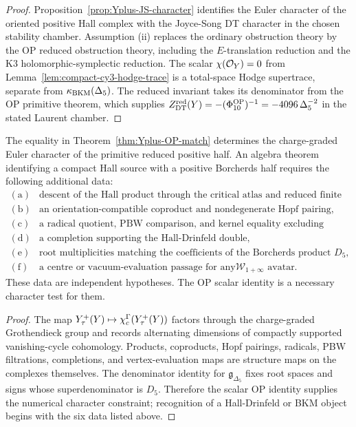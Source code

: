 \begin{proof}
Proposition~\ref{prop:Yplus-JS-character} identifies the Euler character
of the oriented positive Hall complex with the Joyce-Song DT character
in the chosen stability chamber. Assumption (ii) replaces the ordinary
obstruction theory by the OP reduced obstruction theory, including the
$E$-translation reduction and the K3 holomorphic-symplectic reduction.
The scalar $\chi(\mathcal{O}_Y)=0$ from
Lemma~\ref{lem:compact-cy3-hodge-trace} is a total-space Hodge
supertrace, separate from \(\kappa_{\mathrm{BKM}}(\Delta_5)\). The reduced invariant
takes its denominator from the OP primitive theorem, which supplies
$Z^{\mathrm{red}}_{\mathrm{DT}}(Y)=-(\Phi_{10}^{\mathrm{OP}})^{-1}=-4096\,\Delta_5^{-2}$ in the stated Laurent
chamber.
\end{proof}

\begin{proposition}
\label{prop:scalar-character-recognition-boundary}
The equality in Theorem~\ref{thm:Yplus-OP-match} determines the
charge-graded Euler character of the primitive reduced positive half.
An algebra theorem identifying a compact Hall source with a positive
Borcherds half requires the following additional data:
\[
\begin{array}{ll}
\mathrm{(a)}&
\text{descent of the Hall product through the critical atlas and reduced
finite windows,}\\
\mathrm{(b)}&
\text{an orientation-compatible coproduct and nondegenerate Hopf
pairing,}\\
\mathrm{(c)}&
\text{a radical quotient, PBW comparison, and kernel equality excluding
extra relations,}\\
\mathrm{(d)}&
\text{a completion supporting the Hall-Drinfeld double,}\\
\mathrm{(e)}&
\text{root multiplicities matching the coefficients of the
Borcherds product \(D_5\),}\\
\mathrm{(f)}&
\text{a centre or vacuum-evaluation passage for any
\(\mathcal W_{1+\infty}\) avatar.}
\end{array}
\]
These data are independent hypotheses. The OP scalar identity is a
necessary character test for them.
\end{proposition}

\begin{proof}
The map
\(Y^{+}_\tau(Y)\mapsto\chi_c^\Gamma(Y^{+}_\tau(Y))\) factors through
the charge-graded Grothendieck group and records alternating dimensions
of compactly supported vanishing-cycle cohomology. Products,
coproducts, Hopf pairings, radicals, PBW filtrations, completions, and
vertex-evaluation maps are structure maps on the complexes themselves.
The denominator identity for \(\mathfrak g_{\Delta_5}\) fixes root
spaces and signs whose superdenominator is \(D_5\). Therefore the
scalar OP identity supplies the numerical character constraint;
recognition of a Hall-Drinfeld or BKM object begins with the six data
listed above.
\end{proof}

